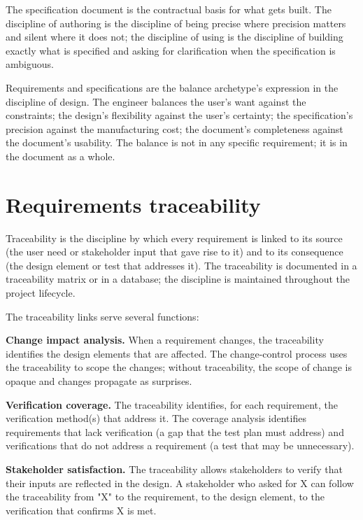 The specification document is the contractual basis for what gets built. The discipline of authoring is the discipline of being precise where precision matters and silent where it does not; the discipline of using is the discipline of building exactly what is specified and asking for clarification when the specification is ambiguous.

\begin{archetype}[balance]
Requirements and specifications are the balance archetype's expression in the discipline of design. The engineer balances the user's want against the constraints; the design's flexibility against the user's certainty; the specification's precision against the manufacturing cost; the document's completeness against the document's usability. The balance is not in any specific requirement; it is in the document as a whole.
\end{archetype}

\section{Requirements traceability}

Traceability is the discipline by which every requirement is linked to its source (the user need or stakeholder input that gave rise to it) and to its consequence (the design element or test that addresses it). The traceability is documented in a traceability matrix or in a database; the discipline is maintained throughout the project lifecycle.

The traceability links serve several functions:

\textbf{Change impact analysis.} When a requirement changes, the traceability identifies the design elements that are affected. The change-control process uses the traceability to scope the changes; without traceability, the scope of change is opaque and changes propagate as surprises.

\textbf{Verification coverage.} The traceability identifies, for each requirement, the verification method(s) that address it. The coverage analysis identifies requirements that lack verification (a gap that the test plan must address) and verifications that do not address a requirement (a test that may be unnecessary).

\textbf{Stakeholder satisfaction.} The traceability allows stakeholders to verify that their inputs are reflected in the design. A stakeholder who asked for X can follow the traceability from "X" to the requirement, to the design element, to the verification that confirms X is met.

